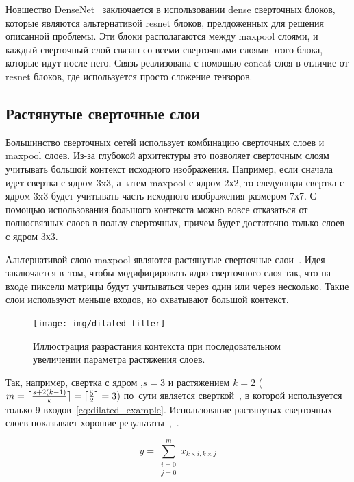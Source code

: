 Новшество DenseNet~\cite{densenet} заключается в использовании dense сверточных блоков, которые являются альтернативой resnet блоков\cite{resnet}, прелдоженных для решения описанной проблемы. Эти блоки располагаются между maxpool слоями, и каждый сверточный слой связан со всеми сверточными слоями этого блока, которые идут после него. Связь реализована с помощью concat слоя в отличие от resnet блоков, где используется просто сложение тензоров.   

\subsection{Растянутые сверточные слои}

Большинство сверточных сетей использует комбинацию сверточных слоев и maxpool слоев. Из-за глубокой архитектуры это позволяет сверточным слоям учитывать большой контекст исходного изображения. Например, если сначала идет свертка с ядром 3x3, а затем maxpool с ядром 2х2, то следующая свертка с ядром 3x3 будет учитывать часть исходного изображения размером 7х7. С помощью использования большого контекста можно вовсе отказаться от полносвязных слоев в пользу сверточных, причем будет достаточно только слоев с ядром 3х3.

Альтернативой слою maxpool являются растянутые сверточные слои~\cite{dilated_conv}. 
Идея заключается в~том, чтобы модифицировать ядро сверточного слоя так, что на входе 
пиксели матрицы будут учитываться через один или через несколько. Такие слои используют 
меньше входов, но охватывают большой контекст. 

\newpage

\begin{figure}[hb]
  \texttt{[image: img/dilated-filter]}
  \caption{Иллюстрация разрастания контекста при последовательном увеличении параметра растяжения слоев.}
\end{figure}

\DeclarePairedDelimiter\ceil{\lceil}{\rceil}
\DeclarePairedDelimiter\floor{\lfloor}{\rfloor}

Так, например, свертка с ядром ,$s=3$ и растяжением $k=2$ 
\mbox{($m=\ceil{\frac{s+2(k-1)}{k}}=\ceil{\frac{5}{2}}=3$)} по~сути является 
сверткой~, в которой используется только 9 входов~\eqref{eq:dilated_example}. 
Использование растянутых сверточных слоев показывает хорошие результаты~\cite{segm_dcnn_crf},~\cite{deeplab}.

\begin{equation}
\label{eq:dilated_example}
y = \sum_{
  \substack{
    i=0 \\
    j=0
  }
}^{m}x_{k\times{}i,k\times{}j}
\end{equation}

